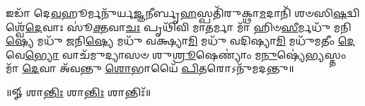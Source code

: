 
\lbrack 𑌇𑌡𑌾᳴ 𑌦𑍇\-\ul{𑌵}\-𑌹𑍂𑌰𑍍𑌮𑌨𑍁᳴𑌰𑍍𑌯\-\ul{𑌜𑍍𑌞}\-𑌨𑍀𑌰𑍍𑌬𑍃\-\ul{𑌹}\-𑌸𑍍𑌪𑌤𑌿᳴𑌰𑍁𑌕𑍍𑌥𑌾\-\ul{𑌮}\-𑌦𑌾𑌨𑌿᳴ 𑌶𑍞𑌸𑌿\-\ul{𑌷}\-𑌦𑍍𑌵𑌿𑌶𑍍𑌵𑍇᳴\-\-\ul{𑌦𑍇}\-𑌵𑌾𑌃 𑌸𑍂॑\-\ul{𑌕𑍍𑌤}\-𑌵𑌾\-\ul{𑌚𑌃} 𑌪𑍃𑌥𑌿᳴𑌵𑌿 𑌮𑌾\-\ul{𑌤}\-𑌰𑍍𑌮𑌾 𑌮𑌾᳴ 𑌹𑌿𑍞\-\ul{𑌸𑍀}\-𑌰𑍍𑌮𑌧𑍁᳴ 𑌮𑌨𑌿\-\ul{𑌷𑍍𑌯𑍇} 𑌮𑌧𑍁᳴ 𑌜𑌨𑌿\-\ul{𑌷𑍍𑌯𑍇} 𑌮𑌧𑍁᳴ 𑌵𑌕𑍍𑌷𑍍𑌯𑌾\-\ul{𑌮𑌿} 𑌮𑌧𑍁᳴ 𑌵𑌦𑌿𑌷𑍍𑌯𑌾\-\ul{𑌮𑌿} 𑌮𑌧𑍁᳴𑌮𑌤𑍀𑌂 \ul{𑌦𑍇}\-𑌵𑍇\-\ul{𑌭𑍍𑌯𑍋} 𑌵𑌾𑌚᳴𑌮𑍁𑌦𑍍𑌯𑌾𑌸𑍞 𑌶𑍁\-\ul{𑌶𑍍𑌰𑍂}\-𑌷𑍇𑌣𑍍𑌯𑌾𑌂॑ 𑌮\-\ul{𑌨𑍁}\-𑌷𑍍𑌯𑍇॑\-\ul{𑌭𑍍𑌯}\-𑌸𑍍𑌤𑌂 𑌮𑌾᳴ \ul{𑌦𑍇}\-𑌵𑌾 𑌅᳴𑌵𑌨𑍍𑌤𑍁 \ul{𑌶𑍋}\-𑌭𑌾𑌯𑍈᳴ \ul{𑌪𑌿}\-𑌤𑌰𑍋𑌽𑌨𑍁᳴𑌮𑌦𑌨𑍍𑌤𑍁॥\rbrack

\centerline{॥𑍐 𑌶𑌾\-\ul{𑌨𑍍𑌤𑌿𑌃} 𑌶𑌾\-\ul{𑌨𑍍𑌤𑌿𑌃} 𑌶𑌾𑌨𑍍𑌤𑌿𑌃᳴॥}

{\small \closesection}
